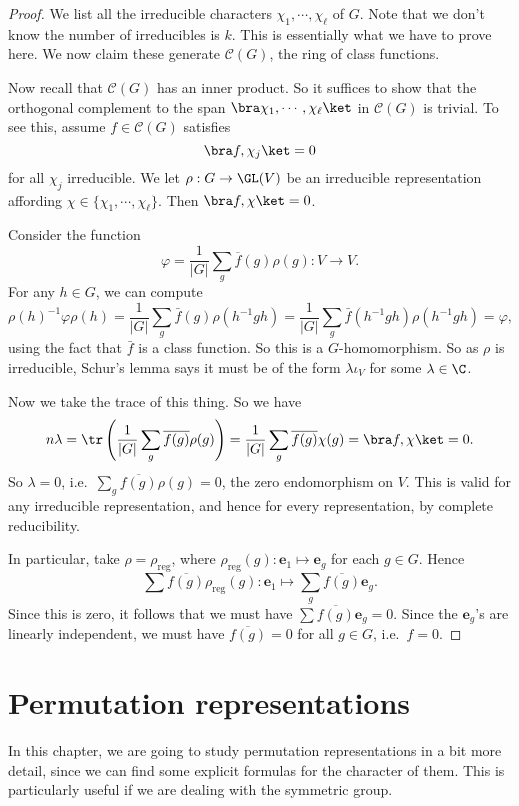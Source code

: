 \documentclass[a4paper]{article}
\begin{document}
\begin{proof}
  We list all the irreducible characters $\chi_1, \cdots, \chi_\ell$ of $G$. Note that we don't know the number of irreducibles is $k$. This is essentially what we have to prove here. We now claim these generate $\mathcal{C}(G)$, the ring of class functions.

  Now recall that $\mathcal{C}(G)$ has an inner product. So it suffices to show that the orthogonal complement to the span $\bra \chi_1, \cdots, \chi_\ell\ket$ in $\mathcal{C}(G)$ is trivial. To see this, assume $f \in \mathcal{C}(G)$ satisfies
  \[
    \bra f, \chi_j\ket = 0
  \]
  for all $\chi_j$ irreducible. We let $\rho: G \to \GL(V)$ be an irreducible representation affording $\chi \in \{\chi_1, \cdots, \chi_\ell\}$. Then $\bra f, \chi\ket = 0$.

  Consider the function
  \[
    \varphi = \frac{1}{|G|} \sum_g \overline{f}(g) \rho(g): V \to V.
  \]
  For any $h \in G$, we can compute
  \[
    \rho(h)^{-1} \varphi \rho(h) = \frac{1}{|G|} \sum_g \bar{f}(g) \rho (h^{-1} gh) = \frac{1}{|G|} \sum_g \bar{f}(h^{-1}gh) \rho(h^{-1}gh) = \varphi,
  \]
  using the fact that $\bar{f}$ is a class function. So this is a $G$-homomorphism. So as $\rho$ is irreducible, Schur's lemma says it must be of the form $\lambda \iota_V$ for some $\lambda \in \C$.

  Now we take the trace of this thing. So we have
  \[
    n\lambda = \tr\left(\frac{1}{|G|} \sum_g \overline{f(g)} \rho(g)\right) = \frac{1}{|G|} \sum_g \overline{f(g)} \chi(g) = \bra f, \chi\ket = 0.
  \]
  So $\lambda = 0$, i.e.\ $\sum_g \overline{f(g)} \rho(g) = 0$, the zero endomorphism on $V$. This is valid for any irreducible representation, and hence for every representation, by complete reducibility.

  In particular, take $\rho = \rho_{\mathrm{reg}}$, where $\rho_{\mathrm{reg}}(g): \mathbf{e}_1 \mapsto \mathbf{e}_g$ for each $g \in G$. Hence
  \[
    \sum \overline{f(g)} \rho_{\mathrm{reg}}(g): \mathbf{e}_1 \mapsto \sum_g \overline{f(g)} \mathbf{e}_g.
  \]
  Since this is zero, it follows that we must have $\sum \overline{f(g)} \mathbf{e}_g = 0$. Since the $\mathbf{e}_g$'s are linearly independent, we must have $\overline{f(g)} = 0$ for all $g \in G$, i.e.\ $f = 0$.
\end{proof}

\section{Permutation representations}
In this chapter, we are going to study permutation representations in a bit more detail, since we can find some explicit formulas for the character of them. This is particularly useful if we are dealing with the symmetric group.
\end{document}
